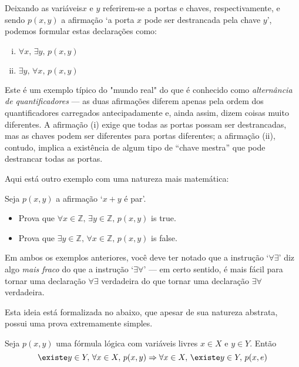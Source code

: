 Deixando as variáveis ​​$x$ e $y$ referirem-se a portas e chaves, respectivamente, e sendo $p(x,y)$ a afirmação `a porta $x$ pode ser destrancada pela chave $y$', podemos formular estas declarações como:
\begin{enumerate}[(i)] 
\item $\forall x,\, \exists y,\, p(x,y)$
\item $\exists y,\, \forall x,\, p(x,y)$
\end{enumerate}

Este é um exemplo típico do "mundo real" do que é conhecido como \textit{alternância de quantificadores} --- as duas afirmações diferem apenas pela ordem dos quantificadores carregados antecipadamente e, ainda assim, dizem coisas muito diferentes. A afirmação (i) exige que todas as portas possam ser destrancadas, mas as chaves podem ser diferentes para portas diferentes; a afirmação (ii), contudo, implica a existência de algum tipo de “chave mestra” que pode destrancar todas as portas.

Aqui está outro exemplo com uma natureza mais matemática:

\begin{exercise}
Seja $p(x,y)$ a afirmação `$x + y$ é par'.
\begin{itemize}
\item Prova que $\forall x \in \mathbb{Z},\, \exists y \in \mathbb{Z},\, p(x,y)$ is true.
\item Prova que $\exists y \in \mathbb{Z},\, \forall x \in \mathbb{Z},\, p(x,y)$ is false.
\end{itemize}
\end{exercise}

Em ambos os exemplos anteriores, você deve ter notado que a instrução `$\forall\exists$' diz algo \textit{mais fraco} do que a instrução `$\exists\forall$' --- em certo sentido, é mais fácil para tornar uma declaração $\forall\exists$ verdadeira do que tornar uma declaração $\exists\forall$ verdadeira.

Esta ideia está formalizada no  abaixo, que apesar de sua natureza abstrata, possui uma prova extremamente simples.

\begin{theorem}
\label{thmQuantifierAlternation}
Seja $p(x,y)$ uma fórmula lógica com variáveis ​​livres $x \in X$ e $y \in Y$. Então
\[\existe y \in Y,\, \forall x \in X,\, p(x,y) \Rightarrow \forall x \in X,\, \existe y \in Y,\, p(x, e)\]
\end{theorem}

